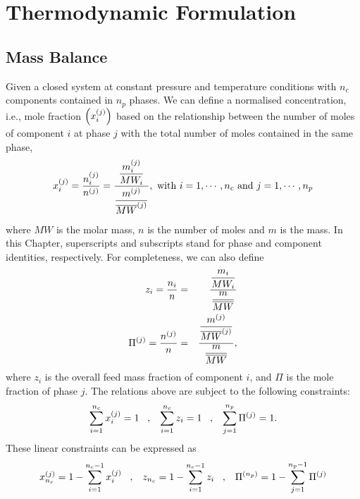
\chapter{Thermodynamic Formulation}\label{Chapter:ThermodynamicFormulation}
 
\section{Mass Balance}\label{Chapter:ThermodynamicFormulation:Section:MassBalance}
Given a closed system at constant pressure and temperature conditions with $n_{c}$ components contained in $n_{p}$ phases. We can define a normalised concentration, i.e., mole fraction $\left(\mfr[x]{i}{j}\right)$ based on the relationship between the number of moles of component $i$ at phase $j$ with the total number of moles contained in the same phase, 
\begin{equation}
    \mfr[x]{i}{j} = \frc{\mfr[n]{i}{j}}{\mfr[n]{}{j}} = \frc{\frc{\mfr[m]{i}{j}}{MW_{i}}}{\frc{\mfr[m]{}{j}}{\mfr[\overline{MW}]{}{j}}}, \hfill \text{ with } i=1, \cdots, n_{c} \text{ and } j=1, \cdots, n_{p}
\label{Chapter:ThermodynamicFormulation:Eqn:MoleFractionDef}
\end{equation}
where $MW$ is the molar mass, $n$ is the number of moles and $m$ is the mass. In this Chapter, superscripts and subscripts stand for phase and component identities, respectively.  For completeness, we can also define
\begin{eqnarray}
    z_{i} = \frc{n_{i}}{n} &=& \frc{\frc{m_{i}}{MW_{i}}}{\frc{m}{\overline{MW}}}\label{Chapter:ThermodynamicFormulation:Eqn:FeedFractionDef} \\
    \mfr[\Pi]{}{j} = \frc{\mfr[n]{}{j}}{n} &=& \frc{\frc{\mfr[m]{}{j}}{\mfr[\overline{MW}]{}{j}}}{\frc{m}{\overline{MW}}},\label{Chapter:ThermodynamicFormulation:Eqn:PhaseFractionDef} 
\end{eqnarray}
where $z_{i}$ is the overall feed mass fraction of component $i$, and $\Pi$ is the mole fraction of phase $j$. The relations above are subject to the following constraints:
\begin{equation}
    \summation_{i=1}^{n_{c}}\mfr[x]{i}{j} = 1 \;\;\;,\;\;\; \summation_{i=1}^{n_{c}}z_{i} = 1 \;\;\;,\;\;\; \summation_{j=1}^{n_{p}}\mfr[\Pi]{}{j} = 1. \label{Chapter:ThermodynamicFormulation:Eqn:FractionConstraints1}
\end{equation}
These linear constraints can be expressed as
\begin{equation}
    \mfr[x]{n_{c}}{j}= 1 - \summation_{i=1}^{n_{c}-1}\mfr[x]{i}{j} \;\;\;,\;\;\; z_{n_{c}}= 1 - \summation_{i=1}^{n_{c}-1}z_{i} \;\;\;,\;\;\; \mfr[\Pi]{}{n_{p}} = 1 - \summation_{j=1}^{n_{p}-1}\mfr[\Pi]{}{j} \label{Chapter:ThermodynamicFormulation:Eqn:FractionConstraints2}
\end{equation}
